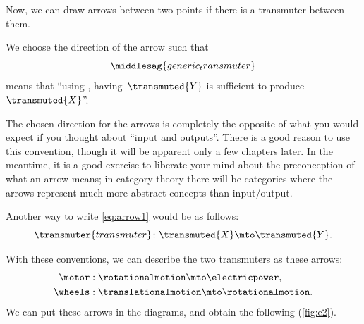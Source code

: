 Now, we can draw arrows between two points if there is a transmuter between them.

We choose the direction of the arrow such that
%
\begin{equation}
    \label{eq:arrow1}
    \middlesag{generic_transmuter}
\end{equation}
means that ``using , having~$\transmuted{Y}$ is sufficient to produce~$\transmuted{X}$''.

\begin{remark}
    The chosen direction for the arrows is completely the opposite of what you would expect if you thought about ``input and outputs''.
    There is a good reason to use this convention, though it will be apparent only a few chapters later.
    In the meantime, it is a good exercise to liberate your mind about the preconception of what an arrow means; in category theory there will be categories where the arrows represent much more abstract concepts than input/output.
\end{remark}

Another way to write \cref{eq:arrow1} would be as follows:
\begin{equation}
    \transmuter{transmuter} \colon \transmuted{X} \mto \transmuted{Y}.
\end{equation}

With these conventions, we can describe the two transmuters as these arrows:
%
\begin{equation}
    \label{eq:transmutation_example}
    \begin{aligned}
        \motor  & : \rotationalmotion \mto \electricpower, \\
        \wheels & : \translationalmotion \mto \rotationalmotion.
    \end{aligned}
\end{equation}
%
We can put these arrows in the diagrams, and obtain the following (\cref{fig:e2}).



